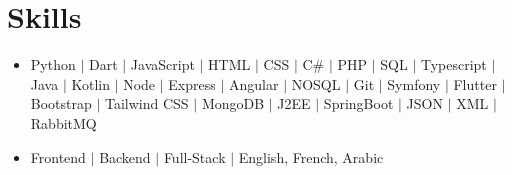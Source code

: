 \documentclass[a4paper,12pt]{article}
\begin{document}
\section{Skills}
\begin{itemize}
\item \normalsize{Python $\vert$ Dart $\vert$ JavaScript $\vert$ HTML $\vert$ CSS $\vert$ C\# $\vert$ PHP $\vert$ SQL  $\vert$ Typescript $\vert$ Java $\vert$ Kotlin $\vert$ Node $\vert$ Express $\vert$ Angular $\vert$ NOSQL $\vert$ Git $\vert$ Symfony $\vert$ Flutter $\vert$ Bootstrap $\vert$ Tailwind CSS $\vert$ MongoDB $\vert$ J2EE $\vert$ SpringBoot $\vert$ JSON $\vert$ XML $\vert$ RabbitMQ}\\
\item \normalsize{Frontend $\vert$ Backend $\vert$ Full-Stack $\vert$ English, French, Arabic}\\
\end{itemize}



\vfill
{}
\end{document}
